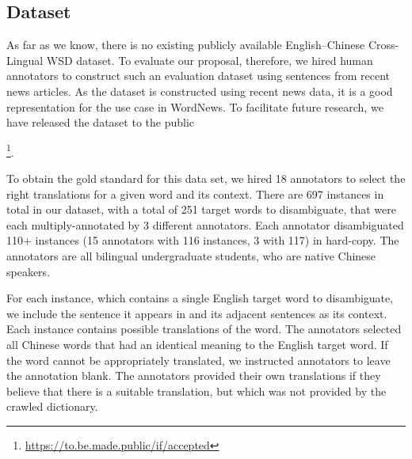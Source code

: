 \subsection{Dataset}
 As far as we know, there 
 is no existing publicly available English--Chinese Cross-Lingual WSD dataset.
 To evaluate our proposal, therefore, we hired human annotators to construct
 such an evaluation dataset using sentences from recent news articles. As the dataset is 
 constructed using recent news data, it is a good representation for the use case in WordNews. To facilitate future research, we have released the dataset to the public{\footnote{%
 		{\url{https://to.be.made.public/if/accepted}}}.
 	 
 
 


To obtain the gold standard for this data set, we hired 18 annotators to select the right translations for a given word and its context. There are 697 instances in total in our dataset, with a total of 251 target words to disambiguate, that were each multiply-annotated by 3 different annotators. Each annotator disambiguated 110+ instances (15 annotators with 116 instances, 3 with 117) in hard-copy. The annotators are all bilingual undergraduate students, who are native Chinese speakers. 

For each instance, which contains a single English target word to disambiguate, we include the sentence it appears in and its adjacent sentences as its context. Each instance contains possible translations of the word. 
The annotators selected all Chinese words that had an identical meaning to the English target word. If the word cannot be appropriately translated, we instructed annotators to leave the annotation blank. The annotators provided their own translations if they believe that there is a suitable translation, but which was not provided by the crawled dictionary. 

}
